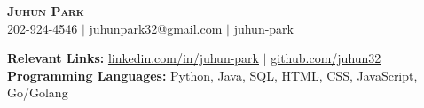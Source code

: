 \documentclass[letterpaper,11pt]{article}
\begin{document}
\begin{center}
    \textbf{\Huge \scshape {Juhun Park}} \\ \vspace{1pt}
    \small 202-924-4546 $|$
    \href{mailto:riann3207@gmail.com}{\underline{juhunpark32@gmail.com}} $|$
    \href{https://juhun32.github.io/juhun-park/}{\underline{juhun-park}}
\end{center}

\small{\textbf{Relevant Links: }
\href{https://linkedin.com/in/juhun-park}{\underline{linkedin.com/in/juhun-park}} $|$     
\href{https://github.com/juhun32}{\underline{github.com/juhun32}}} \\

            \textbf{Programming Languages: } Python, Java, SQL, HTML, CSS, JavaScript, Go/Golang\\
\end{document}
